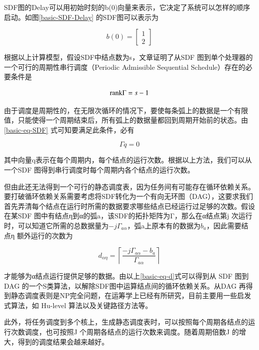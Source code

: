 SDF图的Delay可以用初始时刻的b(0)向量来表示，它决定了系统可以怎样的顺序启动。如图\ref{basic-SDF-Delay} 的SDF图可以表示为

\begin{equation*}
  b(0)=\begin{bmatrix}
    1 \\ 2
  \end{bmatrix}
\end{equation*}

根据以上计算模型，假设SDF中结点数为s，文章\cite{SDF1987}证明了从SDF 图到单个处理器的一个可行的周期性串行调度（Periodic Admissible Sequential Schedule）存在的必要条件是

\begin{equation}
  \label{basic-eq-rank}
  \textnormal{rank}\Gamma=s-1
\end{equation}

由于调度是周期性的，在无限次循环的情况下，要使每条弧上的数据是一个有限值，只能使得一个周期结束后，所有弧上的数据量都回到周期开始前的状态。由\eqref{basic-eq-SDF} 式可知要满足此条件，必有

\begin{equation}
\label{basic-eq-matrix}
  \Gamma{}q=0
\end{equation}

其中向量q表示在每个周期内，每个结点的运行次数。根据以上方法，我们可以从一个SDF 图得到串行调度时每个周期内各个结点的运行次数。

但由此还无法得到一个可行的静态调度表，因为任务间有可能存在循环依赖关系。要打破循环依赖关系需要考虑将SDF转化为一个有向无环图（DAG），这要求我们首先弄清每个结点在运行时所需的数据要求哪些结点已经运行过足够的次数。假设在某SDF 图中有结点η到α的弧a，该SDF的拓扑矩阵为Γ，那么在α结点第j 次运行时，可以知道它所需的总数据量为$-j\Gamma_{a\alpha}$，弧a上原本有的数据为$b_a$，因此需要结点η 额外运行的次数为

\begin{equation}
  \label{basic-eq-d}
  d_{\alpha\eta}=\left\lceil{\frac{-j\Gamma_{a\alpha}-b_a}{\Gamma{}_{a\alpha}}}\right\rceil
\end{equation}

才能够为α结点运行提供足够的数据。由以上\eqref{basic-eq-d}式可以得到从 SDF 图到 DAG 的一个S类算法，以解除SDF图中运算结点间的循环依赖关系。从DAG 再得到静态调度表则是NP完全问题，在运筹学上已经有所研究，目前主要用一些启发式算法，如 Hu-level 算法以及关键路径方法等。

此外，将任务调度到多个核上，生成静态调度表时，可以按照每个周期各结点的运行次数调度，也可按照J 个周期各结点的运行次数来调度。随着周期倍数J 的增大，得到的调度结果会越来越好。

